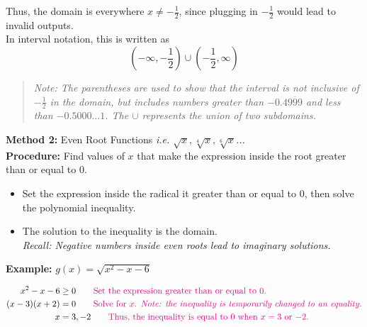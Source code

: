 \documentclass[10pt]{article}
\begin{document}
    Thus, the domain is everywhere $x \neq -\frac{1}{2}$, since plugging in $-\frac{1}{2}$ would lead to invalid outputs. \\
    \indent In interval notation, this is written as $$(-\infty, -\frac{1}{2})\cup (-\frac{1}{2}, \infty)$$ 
    \begin{quote} 
    \textit{Note: The parentheses are used to show that the interval is not inclusive of $-\frac{1}{2}$ in the domain, but includes numbers greater than $-0.4\overline{999}$ and less than $-0.5000...1$. The $\cup$ represents the union of two subdomains.} \\
    \end{quote} 

\noindent \textbf{Method 2:} Even Root Functions \quad \textit{i.e. $\sqrt{x}, \sqrt[4]{x}, \sqrt[6]{x}$...}\\
{\color{magenta}
\textbf{Procedure:} Find values of $x$ that make the expression inside the root greater than or equal to 0.}
\begin{itemize}
    \item Set the expression inside the radical it greater than or equal to 0, then solve the polynomial inequality.
    \item The solution to the inequality is the domain. \\
    \textit{Recall: Negative numbers inside even roots lead to imaginary solutions.}
\end{itemize}
{\color{blue}
\textbf{Example:}} $g(x) = \sqrt{x^2-x-6}$

    \begin{align*}
    x^2-x-6 &\geq 0 \qquad \text{\color{magenta}{Set the expression greater than or equal to 0.}}\\ 
    (x-3)(x+2) &= 0 \qquad \text{\color{magenta}{Solve for $x$. \textit{Note: the inequality is temporarily changed to an equality.}}}\\ 
    x &= 3, -2 \qquad \text{\color{magenta}{Thus, the inequality is equal to 0 when $x = 3$ or $-2$.}}
    \end{align*}
\end{document}
